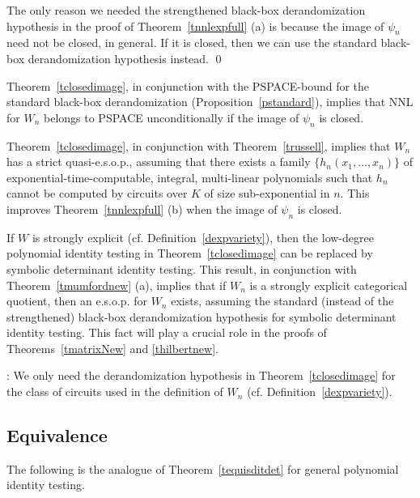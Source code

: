 \documentclass[11pt]{article}
\begin{document}
\proof 
The only reason we needed the strengthened black-box derandomization hypothesis in the proof of Theorem~\ref{tnnlexpfull} (a)
is because
the image of $\psi_n$ need not be closed, in general. If it is closed, then we can use the standard black-box derandomization 
hypothesis instead. \qed

Theorem~\ref{tclosedimage}, 
in conjunction with the PSPACE-bound for the standard black-box derandomization 
(Proposition~\ref{pstandard}), 
implies that NNL for $W_n$ belongs to PSPACE unconditionally if the image of
$\psi_n$ is closed.

Theorem~\ref{tclosedimage}, in conjunction with Theorem~\ref{trussell},
implies that $W_n$ has a strict quasi-e.s.o.p., assuming 
that there exists a family $\{h_n(x_1,\ldots,x_n)\}$ 
of  exponential-time-computable, integral, multi-linear polynomials such that $h_n$  cannot be
computed by circuits over $K$ of size sub-exponential in $n$. This 
improves Theorem~\ref{tnnlexpfull} (b) when the image of $\psi_n$ is closed.


If $W$ is strongly explicit (cf. Definition~\ref{dexpvariety}), then the low-degree polynomial identity testing 
in Theorem~\ref{tclosedimage}   can be replaced by symbolic determinant identity testing.
This result, in conjunction with Theorem~\ref{tmumfordnew} (a),  implies that if $W_n$ is a strongly explicit categorical quotient,
then an e.s.o.p. for $W_n$ exists, assuming the standard (instead of the strengthened)
black-box derandomization hypothesis for symbolic determinant 
identity testing.
This fact will play a crucial role in the proofs of Theorems~\ref{tmatrixNew} and \ref{thilbertnew}.

: We only need the derandomization
hypothesis in Theorem~\ref{tclosedimage} 
 for the class of circuits used in the definition  of  $W_n$ (cf. Definition~\ref{dexpvariety}).


\subsection{Equivalence} \label{sequivfull}
The following is the analogue of Theorem~\ref{tequisditdet} for general polynomial identity testing.
\end{document}
